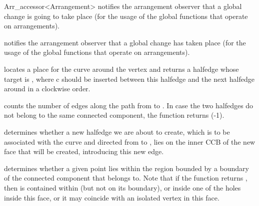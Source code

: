 \begin{ccRefClass}{Arr_accessor<Arrangement>}
    {notifies the arrangement observer that a global change is going to take
     place (for the usage of the global functions that operate on
     arrangements).}

    {notifies the arrangement observer that a global change has taken
     place (for the usage of the global functions that operate on
     arrangements).}

\begin{ccAdvanced}


    {locates a place for the curve  around the vertex 
     and returns a halfedge whose target is , where c should be
     inserted between this halfedge and the next halfedge around 
     in a clockwise order.}

    {counts the number of edges along the path from  to .
     In case the two halfedges do not belong to the same connected component,
     the function returns (-1).}

    {determines whether a new halfedge we are about to create, which is to be associated
     with the curve  and directed from  to
     , lies on the inner CCB of the new face that will be created,
     introducing this new edge.
     }

    {determines whether a given point lies within the region bounded by
     a boundary of the connected component that  belongs to.
     Note that if the function returns , then  is contained within
      (but not on its boundary), or inside one of the holes inside this
     face, or it may coincide with an isolated vertex in this face.}


\end{ccAdvanced}
\end{ccRefClass}
